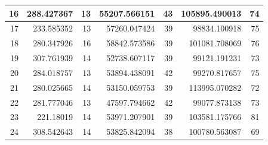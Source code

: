 \begin{table}
\begin{adjustwidth}{}{}
{{\begin{tabular}{|r|r|r|r|r|r|r|}
					\hline
					16                                         & 288.427367                   & 13                                    & 55207.566151                   & 43                                    & 105895.490013                & 74                                     \\ 
					\hline
					17                                         & 233.585352                   & 13                                    & 57260.047424                   & 39                                    & 98834.100918                 & 75                                     \\ 
					\hline
					18                                         & 280.347926                   & 16                                    & 58842.573586                   & 39                                    & 101081.708069                & 76                                     \\ 
					\hline
					19                                         & 307.761939                   & 14                                    & 52738.607117                   & 39                                    & 99121.191231                 & 73                                     \\ 
					\hline
					20                                         & 284.018757                   & 13                                    & 53894.438091                   & 42                                    & 99270.817657                 & 75                                     \\ 
					\hline
					21                                         & 280.025665                   & 14                                    & 53150.059753                   & 39                                    & 113995.070282                & 72                                     \\ 
					\hline
					22                                         & 281.777046                   & 13                                    & 47597.794662                   & 42                                    & 99077.873138                 & 73                                     \\ 
					\hline
					23                                         & 221.18019                    & 14                                    & 53971.207901                   & 39                                    & 103581.175766                & 81                                     \\ 
					\hline
					24                                         & 308.542643                   & 14                                    & 53825.842094                   & 38                                    & 100780.563087                & 69                                     \\ 

\end{tabular}}}
\end{adjustwidth}
\end{table}
